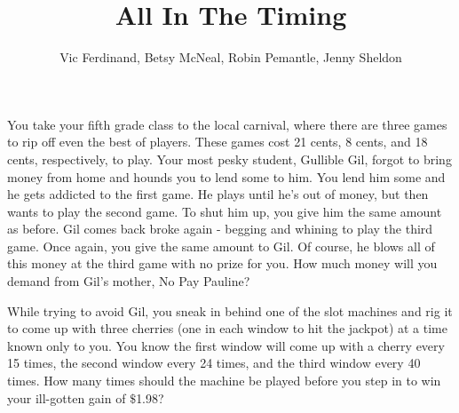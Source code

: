 \documentclass{ximera}
\title{All In The Timing}
\author{Vic Ferdinand, Betsy McNeal, Robin Pemantle, Jenny Sheldon}
\begin{document}
\begin{abstract} \end{abstract}
\maketitle



\begin{problem}
 You take your fifth grade class to the local carnival, where there are three games to rip off even the best of players.  These games cost 21 cents, 8 cents, and 18 cents, respectively, to play.  Your most pesky student, Gullible Gil, forgot to bring money from home and hounds you to lend some to him.  You lend him some and he gets addicted to the first game.  He plays until he's out of money, but then wants to play the second game.  To shut him up, you give him the same amount as before.  Gil comes back broke again - begging and whining to play the third game.  Once again, you give the same amount to Gil.  Of course, he blows all of this money at the third game with no prize for you.  How much money will you demand from Gil's mother, No Pay Pauline?
\end{problem}

\begin{problem}
 While trying to avoid Gil, you sneak in behind one of the slot machines and rig it to come up with three cherries (one in each window to hit the jackpot) at a time known only to you. You know the first window will come up with a cherry every 15 times, the second window every 24 times, and the third window every 40 times.  How many times should the machine be played before you step in to win your ill-gotten gain of $\$$1.98?

\end{problem}
\end{document}
